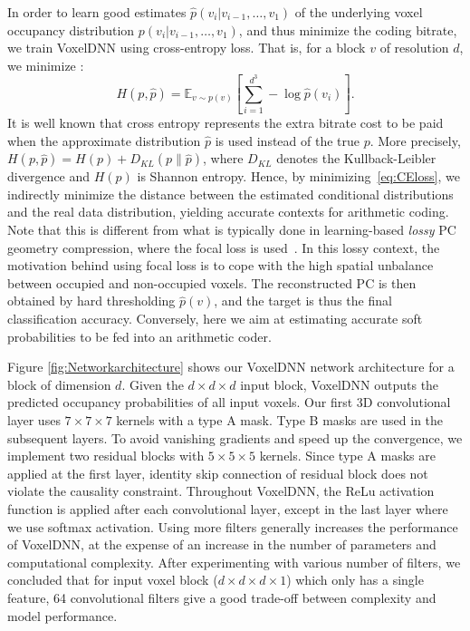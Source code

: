 \par In order to learn good estimates $\hat{p}(v_i|v_{i-1}, \ldots, v_1)$ of the underlying voxel occupancy distribution $p(v_i|v_{i-1}, \ldots, v_1)$, and thus minimize the coding bitrate, we train VoxelDNN using cross-entropy loss. That is, for a block $v$ of resolution $d$, we minimize :
\begin{equation}\label{eq:CEloss}
    H(p,\hat{p}) = \mathbb{E}_{v\sim p(v)}\left[\sum_{i=1}^{d^3} -\log \hat{p}(v_i)\right].
\end{equation}
It is well known that cross entropy represents the extra bitrate cost to be paid when the approximate distribution $\hat{p}$ is used instead of the true $p$. More precisely, $H(p,\hat{p}) = H(p) + D_{KL}(p\| \hat{p})$, where $D_{KL}$ denotes the Kullback-Leibler divergence and $H(p)$ is Shannon entropy. Hence, by minimizing~\eqref{eq:CEloss}, we indirectly minimize the distance between the estimated conditional distributions and the real data distribution, yielding accurate contexts for arithmetic coding. Note that this is different from what is typically done in learning-based \textit{lossy} PC geometry compression, where the focal loss is used~\cite{quach2019learning, quach2020improved}. In this lossy context, the motivation behind using focal loss is to cope with the high spatial unbalance between occupied and non-occupied voxels. The reconstructed PC is then obtained by hard thresholding $\hat{p}(v)$, and the target is thus the final classification accuracy. Conversely, here we aim at estimating accurate soft probabilities to be fed into an arithmetic coder.



\par Figure \ref{fig:Networkarchitecture} shows our VoxelDNN network architecture for a block  of dimension $d$. Given the $d \times d \times d$ input block, VoxelDNN outputs the predicted occupancy probabilities of all input voxels. Our first 3D convolutional layer uses $7 \times 7 \times 7$ kernels with a type A mask. Type B masks are used in the subsequent layers. To avoid vanishing gradients and speed up the convergence, we implement two residual blocks \cite{he2016deep} with $5 \times 5 \times 5$ kernels. Since type A masks are applied at the first layer, identity skip connection of residual block does not violate the causality constraint. Throughout VoxelDNN, the ReLu activation function is applied after each convolutional layer, except in the last layer where we use softmax activation. Using more filters generally increases the performance of 
 VoxelDNN, at the expense of an increase in the number of parameters and computational complexity. After experimenting with various number of filters, we concluded that for input voxel block ($d \times d \times d \times 1$) which only has a single feature, 64 convolutional filters give a good trade-off between complexity and model performance.

